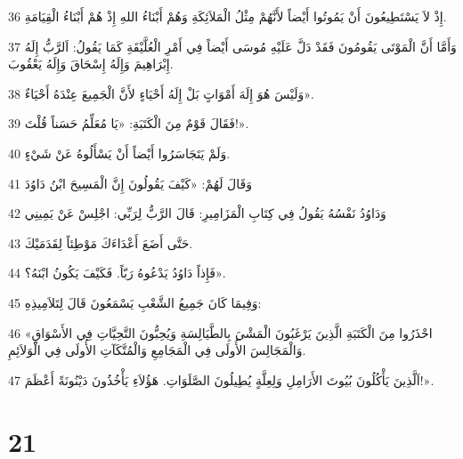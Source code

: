 \par 36 إِذْ لاَ يَسْتَطِيعُونَ أَنْ يَمُوتُوا أَيْضاً لأَنَّهُمْ مِثْلُ الْمَلاَئِكَةِ وَهُمْ أَبْنَاءُ اللهِ إِذْ هُمْ أَبْنَاءُ الْقِيَامَةِ.
\par 37 وَأَمَّا أَنَّ الْمَوْتَى يَقُومُونَ فَقَدْ دَلَّ عَلَيْهِ مُوسَى أَيْضاً فِي أَمْرِ الْعُلَّيْقَةِ كَمَا يَقُولُ: اَلرَّبُّ إِلَهُ إِبْرَاهِيمَ وَإِلَهُ إِسْحَاقَ وَإِلَهُ يَعْقُوبَ.
\par 38 وَلَيْسَ هُوَ إِلَهَ أَمْوَاتٍ بَلْ إِلَهُ أَحْيَاءٍ لأَنَّ الْجَمِيعَ عِنْدَهُ أَحْيَاءٌ».
\par 39 فَقَالَ قَوْمٌ مِنَ الْكَتَبَةِ: «يَا مُعَلِّمُ حَسَناً قُلْتَ!».
\par 40 وَلَمْ يَتَجَاسَرُوا أَيْضاً أَنْ يَسْأَلُوهُ عَنْ شَيْءٍ.
\par 41 وَقَالَ لَهُمْ: «كَيْفَ يَقُولُونَ إِنَّ الْمَسِيحَ ابْنُ دَاوُدَ
\par 42 وَدَاوُدُ نَفْسُهُ يَقُولُ فِي كِتَابِ الْمَزَامِيرِ: قَالَ الرَّبُّ لِرَبِّي: اجْلِسْ عَنْ يَمِينِي
\par 43 حَتَّى أَضَعَ أَعْدَاءَكَ مَوْطِئاً لِقَدَمَيْكَ.
\par 44 فَإِذاً دَاوُدُ يَدْعُوهُ رَبّاً. فَكَيْفَ يَكُونُ ابْنَهُ؟».
\par 45 وَفِيمَا كَانَ جَمِيعُ الشَّعْبِ يَسْمَعُونَ قَالَ لِتَلاَمِيذِهِ:
\par 46 «احْذَرُوا مِنَ الْكَتَبَةِ الَّذِينَ يَرْغَبُونَ الْمَشْيَ بِالطَّيَالِسَةِ وَيُحِبُّونَ التَّحِيَّاتِ فِي الأَسْوَاقِ وَالْمَجَالِسَ الأُولَى فِي الْمَجَامِعِ وَالْمُتَّكَآتِ الأُولَى فِي الْوَلاَئِمِ.
\par 47 اَلَّذِينَ يَأْكُلُونَ بُيُوتَ الأَرَامِلِ وَلِعِلَّةٍ يُطِيلُونَ الصَّلَوَاتِ. هَؤُلاَءِ يَأْخُذُونَ دَيْنُونَةً أَعْظَمَ!».

\chapter{21}

